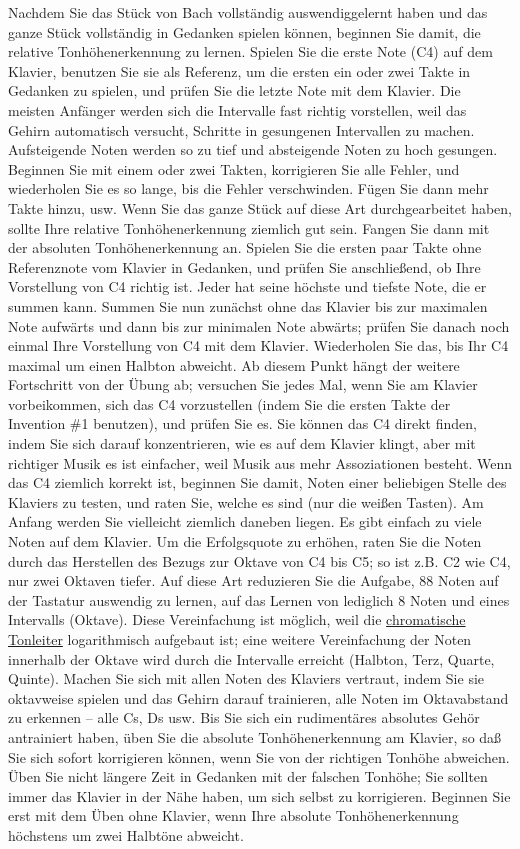 Nachdem Sie das Stück von Bach vollständig auswendiggelernt haben und das ganze Stück vollständig in Gedanken spielen können, beginnen Sie damit, die relative Tonhöhenerkennung zu lernen.
Spielen Sie die erste Note (C4) auf dem Klavier, benutzen Sie sie als Referenz, um die ersten ein oder zwei Takte in Gedanken zu spielen, und prüfen Sie die letzte Note mit dem Klavier.
Die meisten Anfänger werden sich die Intervalle fast richtig vorstellen, weil das Gehirn automatisch versucht, Schritte in gesungenen Intervallen zu machen.
Aufsteigende Noten werden so zu tief und absteigende Noten zu hoch gesungen.
Beginnen Sie mit einem oder zwei Takten, korrigieren Sie alle Fehler, und wiederholen Sie es so lange, bis die Fehler verschwinden.
Fügen Sie dann mehr Takte hinzu, usw.
Wenn Sie das ganze Stück auf diese Art durchgearbeitet haben, sollte Ihre relative Tonhöhenerkennung ziemlich gut sein.
Fangen Sie dann mit der absoluten Tonhöhenerkennung an.
Spielen Sie die ersten paar Takte ohne Referenznote vom Klavier in Gedanken, und prüfen Sie anschließend, ob Ihre Vorstellung von C4 richtig ist.
Jeder hat seine höchste und tiefste Note, die er summen kann.
Summen Sie nun zunächst ohne das Klavier bis zur maximalen Note aufwärts und dann bis zur minimalen Note abwärts; prüfen Sie danach noch einmal Ihre Vorstellung von C4 mit dem Klavier.
Wiederholen Sie das, bis Ihr C4 maximal um einen Halbton abweicht.
Ab diesem Punkt hängt der weitere Fortschritt von der Übung ab; versuchen Sie jedes Mal, wenn Sie am Klavier vorbeikommen, sich das C4 vorzustellen (indem Sie die ersten Takte der Invention \#1 benutzen), und prüfen Sie es.
Sie können das C4 direkt finden, indem Sie sich darauf konzentrieren, wie es auf dem Klavier klingt, aber mit richtiger Musik es ist einfacher, weil Musik aus mehr Assoziationen besteht.
Wenn das C4 ziemlich korrekt ist, beginnen Sie damit, Noten einer beliebigen Stelle des Klaviers zu testen, und raten Sie, welche es sind (nur die weißen Tasten).
Am Anfang werden Sie vielleicht ziemlich daneben liegen.
Es gibt einfach zu viele Noten auf dem Klavier.
Um die Erfolgsquote zu erhöhen, raten Sie die Noten durch das Herstellen des Bezugs zur Oktave von C4 bis C5; so ist z.B. C2 wie C4, nur zwei Oktaven tiefer.
Auf diese Art reduzieren Sie die Aufgabe, 88 Noten auf der Tastatur auswendig zu lernen, auf das Lernen von lediglich 8 Noten und eines Intervalls (Oktave).
Diese Vereinfachung ist möglich, weil die \hyperref[c2_2]{chromatische Tonleiter} logarithmisch aufgebaut ist; eine weitere Vereinfachung der Noten innerhalb der Oktave wird durch die Intervalle erreicht (Halbton, Terz, Quarte, Quinte).
Machen Sie sich mit allen Noten des Klaviers vertraut, indem Sie sie oktavweise spielen und das Gehirn darauf trainieren, alle Noten im Oktavabstand zu erkennen -- alle Cs, Ds usw.
Bis Sie sich ein rudimentäres absolutes Gehör antrainiert haben, üben Sie die absolute Tonhöhenerkennung am Klavier, so daß Sie sich sofort korrigieren können, wenn Sie von der richtigen Tonhöhe abweichen.
Üben Sie nicht längere Zeit in Gedanken mit der falschen Tonhöhe; Sie sollten immer das Klavier in der Nähe haben, um sich selbst zu korrigieren.
Beginnen Sie erst mit dem Üben ohne Klavier, wenn Ihre absolute Tonhöhenerkennung höchstens um zwei Halbtöne abweicht.

